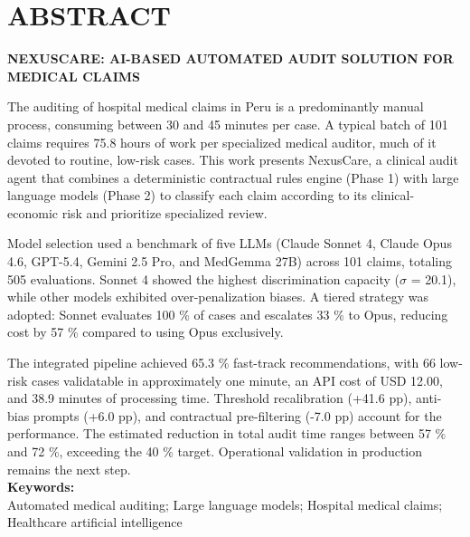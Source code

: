 \chapter*{\center \Large \vspace{-4.5cm} ABSTRACT}
\thispagestyle{empty}
\begin{center}
\Large \vspace{-1.5cm} \textbf{NEXUSCARE: AI-BASED AUTOMATED AUDIT SOLUTION FOR MEDICAL CLAIMS}
\end{center}

\noindent
The auditing of hospital medical claims in Peru is a predominantly manual process, consuming between 30 and 45 minutes per case. A typical batch of 101 claims requires 75.8 hours of work per specialized medical auditor, much of it devoted to routine, low-risk cases. This work presents NexusCare, a clinical audit agent that combines a deterministic contractual rules engine (Phase 1) with large language models (Phase 2) to classify each claim according to its clinical-economic risk and prioritize specialized review.

Model selection used a benchmark of five LLMs (Claude Sonnet 4, Claude Opus 4.6, GPT-5.4, Gemini 2.5 Pro, and MedGemma 27B) across 101 claims, totaling 505 evaluations. Sonnet 4 showed the highest discrimination capacity ($\sigma$ = 20.1), while other models exhibited over-penalization biases. A tiered strategy was adopted: Sonnet evaluates 100 \% of cases and escalates 33 \% to Opus, reducing cost by 57 \% compared to using Opus exclusively.

The integrated pipeline achieved 65.3 \% fast-track recommendations, with 66 low-risk cases validatable in approximately one minute, an API cost of USD 12.00, and 38.9 minutes of processing time. Threshold recalibration (+41.6 pp), anti-bias prompts (+6.0 pp), and contractual pre-filtering (-7.0 pp) account for the performance. The estimated reduction in total audit time ranges between 57 \% and 72 \%, exceeding the 40 \% target. Operational validation in production remains the next step. \\


\noindent \textbf{Keywords:}\\
\noindent Automated medical auditing; Large language models; Hospital medical claims; Healthcare artificial intelligence

\newpage
